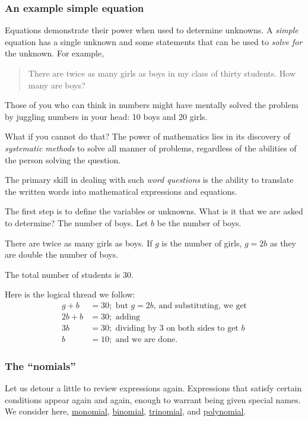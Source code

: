 \documentclass[
  a4paper,
]{article}
\begin{document}
\subsubsection{An example simple
equation}\label{an-example-simple-equation}

Equations demonstrate their power when used to determine unknowns. A
\emph{simple} equation has a single unknown and some statements that can
be used to \emph{solve for} the unknown. For example,

\begin{quote}
There are twice as many girls as boys in my class of thirty students.
How many are boys?
\end{quote}

Those of you who can think in numbers might have mentally solved the
problem by juggling numbers in your head: 10 boys and 20 girls.

What if you cannot do that? The power of mathematics lies in its
discovery of \emph{systematic methods} to solve all manner of problems,
regardless of the abilities of the person solving the question.

The primary skill in dealing with such \emph{word questions} is the
ability to translate the written words into mathematical expressions and
equations.

The first step is to define the variables or unknowns. What is it that
we are asked to determine? The number of boys. Let \(b\) be the number
of boys.

There are twice as many girls as boys. If \(g\) is the number of girls,
\(g = 2b\) as they are double the number of boys.

The total number of students is \(30\).

Here is the logical thread we follow: \[
\begin{aligned}
g + b &= 30; \text{ but $g = 2b$, and substituting, we get}\\
2b + b &= 30; \text{ adding}\\
3b &= 30; \text{ dividing by $3$ on both sides to get $b$}\\
b &= 10; \text{ and we are done.} 
\end{aligned}
\]

\subsubsection{The ``nomials''}\label{the-nomials}

Let us detour a little to review expressions again. Expressions that
satisfy certain conditions appear again and again, enough to warrant
being given special names. We consider here,
\href{https://en.wikipedia.org/wiki/Monomial}{monomial},
\href{https://en.wikipedia.org/wiki/Binomial_(polynomial)}{binomial},
\href{https://en.wikipedia.org/wiki/Trinomial}{trinomial}, and
\href{https://en.wikipedia.org/wiki/Polynomial}{polynomial}.
\end{document}
